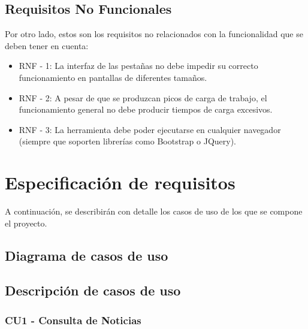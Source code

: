 \subsection{Requisitos No Funcionales}

Por otro lado, estos son los requisitos no relacionados con la funcionalidad que se deben tener en cuenta:

\begin{itemize}

\item RNF - 1: La interfaz de las pestañas no debe impedir su correcto funcionamiento en pantallas de diferentes tamaños.

\item RNF - 2: A pesar de que se produzcan picos de carga de trabajo, el funcionamiento general no debe producir tiempos de carga excesivos.

\item RNF - 3: La herramienta debe poder ejecutarse en cualquier navegador (siempre que soporten librerías como Bootstrap o JQuery).

\end{itemize}

\section{Especificación de requisitos}

A continuación, se describirán con detalle los casos de uso de los que se compone el proyecto.

\subsection{Diagrama de casos de uso}


\subsection{Descripción de casos de uso}

\subsubsection{CU1 - Consulta de Noticias}


